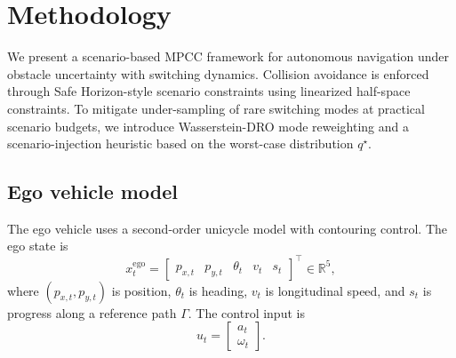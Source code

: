 \documentclass[letterpaper,10pt,conference]{ieeeconf}
\begin{document}
\section{Methodology}\label{methods}

We present a scenario-based MPCC framework for autonomous navigation under obstacle uncertainty with switching dynamics.
Collision avoidance is enforced through Safe Horizon-style scenario constraints \cite{degroot2023SBMotionBounded} using linearized half-space constraints.
To mitigate under-sampling of rare switching modes at practical scenario budgets, we introduce Wasserstein-DRO mode reweighting and a scenario-injection heuristic based on the worst-case distribution $q^\star$.

\subsection{Ego vehicle model}\label{sec:ego_model}

The ego vehicle uses a second-order unicycle model with contouring control. The ego state is
\begin{equation}\label{eq:ego_state}
x_t^{\mathrm{ego}}
=
\begin{bmatrix}
p_{x,t} & p_{y,t} & \theta_t & v_t & s_t
\end{bmatrix}^\top
\in \mathbb{R}^5,
\end{equation}
where $(p_{x,t}, p_{y,t})$ is position, $\theta_t$ is heading, $v_t$ is longitudinal speed, and $s_t$ is progress along a reference path $\Gamma$.
The control input is
\begin{equation}
u_t =
\begin{bmatrix}
a_t \\ \omega_t
\end{bmatrix}.
\end{equation}
\end{document}
